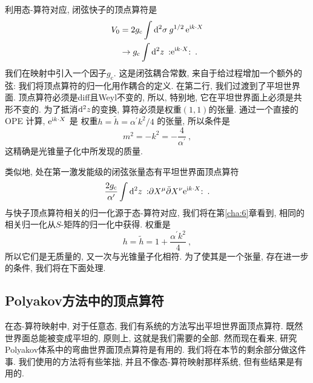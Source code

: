 利用态-算符对应, 闭弦快子的顶点算符是
\begin{align}
		V_{0} &=2 g_{\mathrm{c}} \int \mathrm{d}^{2} \sigma \: g^{1 / 2} \,\mathrm{e}^{\mathrm{i} k \cdot X}  \nonumber \\
		& \rightarrow g_{\mathrm{c}} \int \mathrm{d}^{2} z\: : \mathrel{\mathrm{e}^{\mathrm{i} k \cdot X}}: \:. \label{3.6.1}
\end{align}
我们在映射中引入一个因子$g_{\mathrm{c}}$. 这是闭弦耦合常数, 来自于给过程增加一个额外的弦: 我们将顶点算符的归一化用作耦合的定义. 在第二行, 我们过渡到了平坦世界面. 顶点算符必须是diff且Weyl不变的, 所以, 特别地, 它在平坦世界面上必须是共形不变的. 为了抵消$\mathrm{d}^2 z$的变换, 算符必须是权重$(1,1)$的张量. 通过一个直接的 OPE 计算, $\mathrm{e}^{\mathrm{i} k \cdot X}$ 是 权重$h=\tilde{h}=\alpha^{\prime} k^{2} / 4$ 的张量, 所以条件是
\begin{equation}
	m^{2}=-k^{2}=-\frac{4}{\alpha^{\prime}} \:, \label{3.6.2}
\end{equation}
这精确是光锥量子化中所发现的质量.

类似地, 处在第一激发能级的闭弦张量态有平坦世界面顶点算符
\begin{equation}
\frac{2 g_{\mathrm{c}}}{\alpha^{\prime}} \int \mathrm{d}^{2} z\: : \mathrel{\partial X^{\mu} \bar{\partial} X^{\nu} \mathrm{e}^{\mathrm{i} k \cdot X}}: \:. \label{3.6.3}
\end{equation}
与快子顶点算符相关的归一化源于态-算符对应, 我们将在第\ref{cha:6}章看到, 相同的相关归一化从$S$-矩阵的归一化中获得. 权重是
\begin{equation}
h=\tilde{h}=1+\frac{\alpha^{\prime} k^{2}}{4} \:, \label{3.6.4}
\end{equation}
所以它们是无质量的, 又一次与光锥量子化相符. 为了使其是一个张量, 存在进一步的条件, 我们将在下面处理.

\subsection*{Polyakov方法中的顶点算符}

在态-算符映射中, 对于任意态, 我们有系统的方法写出平坦世界面顶点算符. 既然世界面总能被变成平坦的, 原则上, 这就是我们需要的全部. 然而现在看来, 研究Polyakov体系中的弯曲世界面顶点算符是有用的. 我们将在本节的剩余部分做这件事. 我们使用的方法将有些笨拙, 并且不像态-算符映射那样系统, 但有些结果是有用的.

